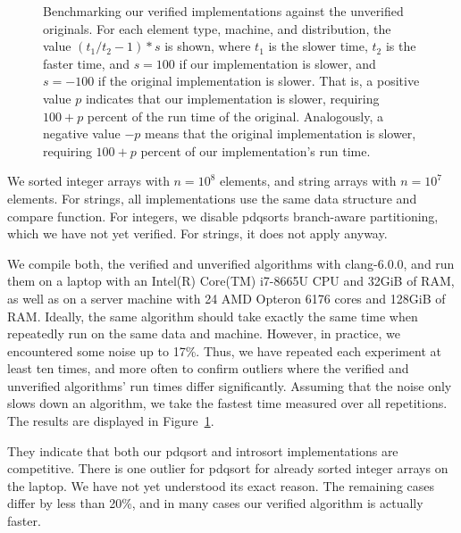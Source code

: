 \documentclass[runningheads]{llncs}
\begin{document}
{  \begin{figure}
  \plotpdqsort
  \plotintrosort
  \caption{Benchmarking our verified implementations against the unverified originals.
    For each element type, machine, and distribution, the value $(t_1/t_2-1)*s$ is shown,
    where $t_1$ is the slower time, $t_2$ is the faster time, and $s = 100$ if our implementation is slower,
    and $s=-100$ if the original implementation is slower. That is, a positive value $p$ indicates that our implementation is slower,
    requiring $100+p$ percent of the run time of the original. Analogously,
    a negative value $-p$ means that the original implementation is slower, requiring $100+p$ percent of our implementation's run time.
  }\label{fig:benchres}
  \end{figure}

  We sorted integer arrays with $n=10^8$ elements, and string arrays with $n=10^7$ elements.
  For strings, all implementations use the same data structure and compare function.
  For integers, we disable pdqsorts branch-aware partitioning, which we have not yet verified.
  For strings, it does not apply anyway.


  We compile both, the verified and unverified algorithms with clang-6.0.0, and run them on a laptop with an Intel(R) Core(TM) i7-8665U CPU and 32GiB of RAM,
  as well as on a server machine with 24 AMD Opteron 6176 cores and 128GiB of RAM.
  Ideally, the same algorithm should take exactly the same time when repeatedly run on the same data and machine. However, in practice,
  we encountered some noise up to 17\%. Thus, we have repeated each experiment at least ten times, and more often to confirm outliers
  where the verified and unverified algorithms' run times differ significantly. Assuming that the noise only slows down an algorithm,
  we take the fastest time measured over all repetitions.
  The results are displayed in Figure~\ref{fig:benchres}.

%
  They indicate that both our pdqsort and introsort implementations are competitive.
  There is one outlier for pdqsort for already sorted integer arrays on the laptop. We have not yet understood its exact reason.
  The remaining cases differ by less than 20\%, and in many cases our verified algorithm is actually faster.

}
\end{document}
